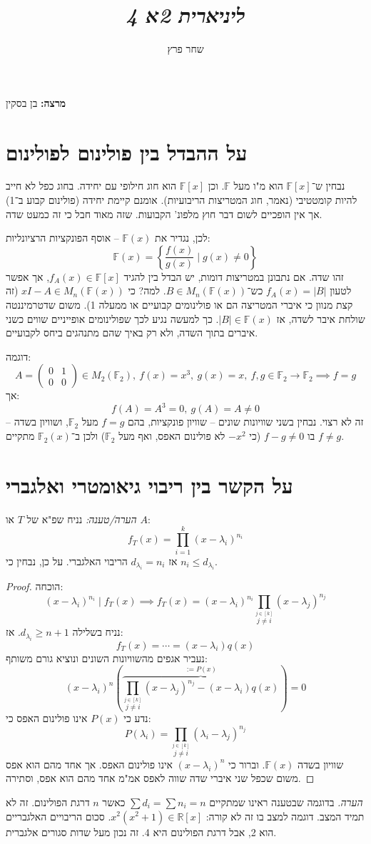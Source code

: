 \documentclass[]{article}
\author{שחר פרץ}
\title{\textit{ליניארית 2א 4}}
\newcommand\R     {\mathbb{R}}
\newcommand\F         {\mathbb{F}}
\newcommand\pms[1]    {\begin{pmatrix}
		#1
\end{pmatrix}}
\renewcommand\lg      {\lambda}
\newcommand\cl [1]    {\left ( #1 \right )}
\newcommand\ccb[1]    {\left \{ #1 \right \}}
\theoremstyle{definition}
\begin{document}
	\maketitle
	\textbf{מרצה: }בן בסקין
	\section{על ההבדל בין פולינום לפולינום}
	נבחין ש־$\F[x]$ הוא מ"ו מעל $\F$. וכן $\F[x]$ הוא חוג חילופי עם יחידה. בחוג כפל לא חייב להיות קומטטיבי (נאמר, חוג המטריצות הריבועיות). אומנם קיימת יחידה (פולינום קבוע ב־1) אך אין הופכיים לשום דבר חוץ מלפונ' הקבועות. שזה מאוד חבל כי זה כמעט שדה. 
	
	לכן, נגדיר את $\F(x)$ – אוסף הפונקציות הרציונליות: 
	\[ \F(x) = \ccb{\frac{f(x)}{g(x)} \mid g(x) \neq 0} \]
	זהו שדה. אם נתבונן במטריצות דומות, יש הבדל בין להגיד $f_A(x) \in \F[x]$, אך אפשר לטעון $f_A(x) = |B|$ כש־$B \in M_n(\F(x))$. למה? כי $xI - A \in M_n(\F(x))$ (זה קצת מנוון כי איברי המטריצה הם או פולינומים קבועיים או ממעלה 1). משום שדטרמיננטה שולחת איבר לשדה, אז $|B| \in \F(x)$. כך למעשה נגיע לכך שפולינומים אופייניים שווים כשני איברים בתוך השדה, ולא רק באיך שהם מתנהגים ביחס לקבועיים. 
	
	דוגמה: 
	\[ A = \pms{0 & 1 \\ 0 & 0} \in M_2(\F_2), \ f(x) = x^3, \ g(x) = x, \ f, g \in \F_2 \to \F_2 \implies f = g \]
	אך: 
	\[ f(A) = A^3 = 0, \ g(A) = A \neq 0 \]
	זה לא רצוי. נבחין בשני שוויונות שונים – שוויון פונקציות, בהם $f = g$ מעל $\F_2$, ושוויון בשדה – בו $f -g \neq 0$ (כי $-x^2$ לא פולינום האפס, ואף מעל $\F_2$) ולכן ב־$\F_2(x)$ מתקיים $f \neq g$. 
	
	\section{על הקשר בין ריבוי גיאומטרי ואלגברי}
	\textit{הערה/טענה: }נניח שפ"א של $T$ או $A$: 
	\[ f_T(x) = \prod_{i = 1}^{k}(x - \lg_i)^{n_i} \]
	אז $d_{\lg_i} = n_i$ הריבוי האלגברי. על כן, נבחין כי $n_i \le d_{\lg_i}$. \begin{proof}
		{הוכחה: }
		\[ (x - \lg_i)^{n_i} \mid f_T(x) \implies f_T(x) = (x - \lg_i)^{n_i} \prod_{\overset{j \in [k]}{j \neq i}}(x - \lg_j)^{n_j} \]
		נניח בשלילה $d_{\lg_i} \ge n + 1$. אז: 
		\[ f_T(x) = \cdots = (x - \lg_i)q(x) \]
		נעביר אגפים מהשוויונות השונים ונוציא גורם משותף: 
		\[ (x - \lg_i)^{n}\cl{\overbrace{\prod_{\overset{j \in [k]}{j \neq i}}(x - \lg_j)^{n_j} - (x - \lg_i)q(x)}^{:=P(x)}} = 0 \]
		נדע כי $P(x)$ אינו פולינום האפס כי: 
		\[ P(\lg_i) = \prod_{\overset{j \in [k]}{j \neq i}}(\lg_i - \lg_j)^{n_j} \]
		שוויון בשדה $\F(x)$. וברור כי $(x - \lg_i)^{n}$ אינו פולינום האפס. אך אחד מהם הוא אפס משום שכפל שני איברי שדה שווה לאפס אמ"מ אחד מהם הוא אפס, וסתירה. 
	\end{proof}
	\textit{הערה. }בדוגמה שבטענה ראינו שמתקיים $\sum d_i = \sum n_i = n$ כאשר $n$ דרגת הפולינום. זה לא תמיד המצב. 
	דוגמה למצב בו זה לא קורה: $x^2(x^2 + 1) \in \R[x]$. סכום הריבויים האלגבריים הוא 2, אבל דרגת הפולינום היא 4. זה נכון מעל שדות סגורים אלגברית. 
	
\end{document}
